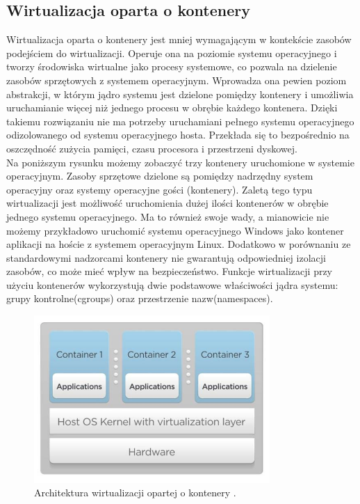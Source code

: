 \documentclass[12pt]{report}
\let\Oldsubsection\subsection
\renewcommand{\subsection}{\FloatBarrier\Oldsubsection}
\begin{document}
\subsection{Wirtualizacja oparta o kontenery}
Wirtualizacja oparta o kontenery jest mniej wymagającym w kontekście zasobów podejściem do wirtualizacji. Operuje ona na poziomie systemu operacyjnego i tworzy środowiska wirtualne jako procesy systemowe, co pozwala na dzielenie zasobów sprzętowych z systemem operacyjnym. Wprowadza ona pewien poziom abstrakcji, w którym jądro systemu jest dzielone pomiędzy kontenery i umożliwia uruchamianie więcej niż jednego procesu w obrębie każdego kontenera. Dzięki takiemu rozwiązaniu nie ma potrzeby uruchamiani pełnego systemu operacyjnego odizolowanego od systemu operacyjnego hosta. Przekłada się to bezpośrednio na oszczędność zużycia pamięci, czasu procesora i przestrzeni dyskowej. \\
\indent Na poniższym rysunku możemy zobaczyć trzy kontenery uruchomione w systemie operacyjnym. Zasoby sprzętowe dzielone są pomiędzy nadrzędny system operacyjny oraz systemy operacyjne gości (kontenery). Zaletą tego typu wirtualizacji jest możliwość uruchomienia dużej ilości kontenerów w obrębie jednego systemu operacyjnego. Ma to również swoje wady, a mianowicie nie możemy przykładowo uruchomić systemu operacyjnego Windows jako kontener aplikacji na hoście z systemem operacyjnym Linux. Dodatkowo w porównaniu ze standardowymi nadzorcami kontenery nie gwarantują odpowiedniej izolacji zasobów, co może mieć wpływ na bezpieczeństwo. Funkcje wirtualizacji przy użyciu kontenerów wykorzystują dwie podstawowe właściwości jądra systemu: grupy kontrolne(cgroups) oraz przestrzenie nazw(namespaces).

\begin{figure}[h]
	\centering
	\includegraphics[width=0.8\textwidth]{images/containerArch.jpg}
	\caption{Architektura wirtualizacji opartej o kontenery \cite{hypervisorArchImg}.}
\end{figure}
\end{document}
